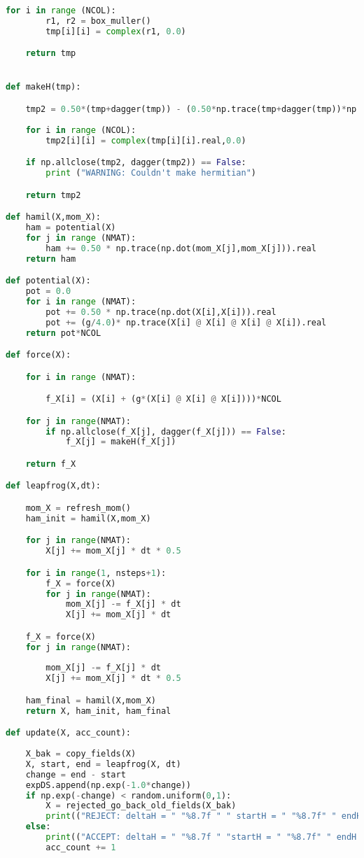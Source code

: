 \begin{footnotesize}
\begin{lstlisting}[language=Python]
    for i in range (NCOL):
        r1, r2 = box_muller()
        tmp[i][i] = complex(r1, 0.0) 

    return tmp


def makeH(tmp):

    tmp2 = 0.50*(tmp+dagger(tmp)) - (0.50*np.trace(tmp+dagger(tmp))*np.eye(NCOL))/NCOL
    
    for i in range (NCOL):
        tmp2[i][i] = complex(tmp[i][i].real,0.0)  

    if np.allclose(tmp2, dagger(tmp2)) == False:
        print ("WARNING: Couldn't make hermitian")

    return tmp2

def hamil(X,mom_X):
    ham = potential(X) 
    for j in range (NMAT):
        ham += 0.50 * np.trace(np.dot(mom_X[j],mom_X[j])).real 
    return ham  

def potential(X):
    pot = 0.0 
    for i in range (NMAT):
        pot += 0.50 * np.trace(np.dot(X[i],X[i])).real   
        pot += (g/4.0)* np.trace(X[i] @ X[i] @ X[i] @ X[i]).real
    return pot*NCOL

def force(X): 

    for i in range (NMAT): 

        f_X[i] = (X[i] + (g*(X[i] @ X[i] @ X[i])))*NCOL

    for j in range(NMAT):
        if np.allclose(f_X[j], dagger(f_X[j])) == False:
            f_X[j] = makeH(f_X[j])

    return f_X

def leapfrog(X,dt):

    mom_X = refresh_mom()
    ham_init = hamil(X,mom_X)

    for j in range(NMAT):
        X[j] += mom_X[j] * dt * 0.5 

    for i in range(1, nsteps+1):
        f_X = force(X)
        for j in range(NMAT):
            mom_X[j] -= f_X[j] * dt
            X[j] += mom_X[j] * dt

    f_X = force(X)
    for j in range(NMAT):
        
        mom_X[j] -= f_X[j] * dt
        X[j] += mom_X[j] * dt * 0.5 

    ham_final = hamil(X,mom_X)
    return X, ham_init, ham_final

def update(X, acc_count):
    
    X_bak = copy_fields(X) 
    X, start, end = leapfrog(X, dt) 
    change = end - start  
    expDS.append(np.exp(-1.0*change)) 
    if np.exp(-change) < random.uniform(0,1):
        X = rejected_go_back_old_fields(X_bak)
        print(("REJECT: deltaH = " "%8.7f " " startH = " "%8.7f" " endH = " "%8.7f" % (change, start, end)))
    else:   
        print(("ACCEPT: deltaH = " "%8.7f " "startH = " "%8.7f" " endH = " "%8.7f" % (change, start, end)))
        acc_count += 1 


\end{lstlisting}
\end{footnotesize}
